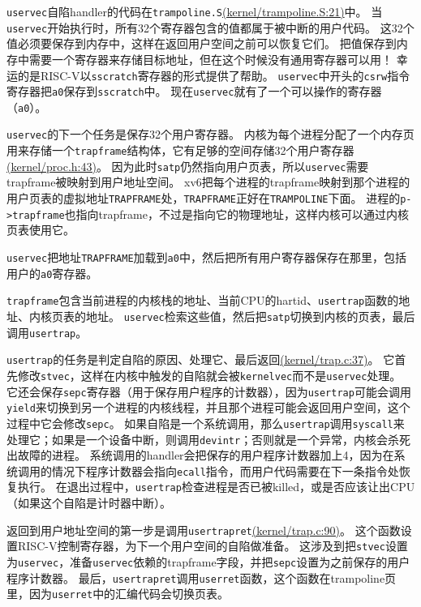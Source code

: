 \texttt{uservec}自陷handler的代码在\texttt{trampoline.S}\href{https://github.com/mit-pdos/xv6-riscv/blob/riscv//kernel/trampoline.S#L21}{(kernel/trampoline.S:21)}中。
当\texttt{uservec}开始执行时，所有32个寄存器包含的值都属于被中断的用户代码。
这32个值必须要保存到内存中，这样在返回用户空间之前可以恢复它们。
把值保存到内存中需要一个寄存器来存储目标地址，但在这个时候没有通用寄存器可以用！
幸运的是RISC-V以\texttt{sscratch}寄存器的形式提供了帮助。
\texttt{uservec}中开头的\texttt{csrw}指令寄存器把\texttt{a0}保存到\texttt{sscratch}中。
现在\texttt{uservec}就有了一个可以操作的寄存器（\texttt{a0}）。

\texttt{uservec}的下一个任务是保存32个用户寄存器。
内核为每个进程分配了一个内存页用来存储一个\texttt{trapframe}结构体，它有足够的空间存储32个用户寄存器\href{https://github.com/mit-pdos/xv6-riscv/blob/riscv//kernel/proc.h#L43}{(kernel/proc.h:43)}。
因为此时\texttt{satp}仍然指向用户页表，所以\texttt{uservec}需要trapframe被映射到用户地址空间。
xv6把每个进程的trapframe映射到那个进程的用户页表的虚拟地址\texttt{TRAPFRAME}处，\texttt{TRAPFRAME}正好在\texttt{TRAMPOLINE}下面。
进程的\texttt{p->trapframe}也指向trapframe，不过是指向它的物理地址，这样内核可以通过内核页表使用它。

\texttt{uservec}把地址\texttt{TRAPFRAME}加载到\texttt{a0}中，然后把所有用户寄存器保存在那里，包括用户的\texttt{a0}寄存器。

\texttt{trapframe}包含当前进程的内核栈的地址、当前CPU的hartid、\texttt{usertrap}函数的地址、内核页表的地址。
\texttt{uservec}检索这些值，然后把\texttt{satp}切换到内核的页表，最后调用\texttt{usertrap}。

\texttt{usertrap}的任务是判定自陷的原因、处理它、最后返回\href{https://github.com/mit-pdos/xv6-riscv/blob/riscv//kernel/trap.c#L37}{(kernel/trap.c:37)}。
它首先修改\texttt{stvec}，这样在内核中触发的自陷就会被\texttt{kernelvec}而不是\texttt{uservec}处理。
它还会保存\texttt{sepc}寄存器（用于保存用户程序的计数器），因为\texttt{usertrap}可能会调用\texttt{yield}来切换到另一个进程的内核线程，并且那个进程可能会返回用户空间，这个过程中它会修改\texttt{sepc}。
如果自陷是一个系统调用，那么\texttt{usertrap}调用\texttt{syscall}来处理它；如果是一个设备中断，则调用\texttt{devintr}；否则就是一个异常，内核会杀死出故障的进程。
系统调用的handler会把保存的用户程序计数器加上4，因为在系统调用的情况下程序计数器会指向\texttt{ecall}指令，而用户代码需要在下一条指令处恢复执行。
在退出过程中，\texttt{usertrap}检查进程是否已被killed，或是否应该让出CPU（如果这个自陷是计时器中断）。

返回到用户地址空间的第一步是调用\texttt{usertrapret}\href{https://github.com/mit-pdos/xv6-riscv/blob/riscv//kernel/trap.c#L90}{(kernel/trap.c:90)}。
这个函数设置RISC-V控制寄存器，为下一个用户空间的自陷做准备。
这涉及到把\texttt{stvec}设置为\texttt{uservec}，准备\texttt{uservec}依赖的trapframe字段，并把\texttt{sepc}设置为之前保存的用户程序计数器。
最后，\texttt{usertrapret}调用\texttt{userret}函数，这个函数在trampoline页里，因为\texttt{userret}中的汇编代码会切换页表。

